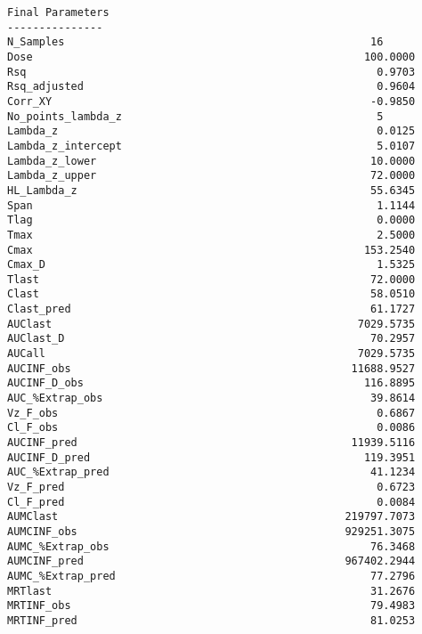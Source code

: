 \documentclass[12pt,a4paper]{article}
\begin{document}
\begin{verbatim}
Final Parameters
---------------
N_Samples                                                16
Dose                                                    100.0000
Rsq                                                       0.9703
Rsq_adjusted                                              0.9604
Corr_XY                                                  -0.9850
No_points_lambda_z                                        5
Lambda_z                                                  0.0125
Lambda_z_intercept                                        5.0107
Lambda_z_lower                                           10.0000
Lambda_z_upper                                           72.0000
HL_Lambda_z                                              55.6345
Span                                                      1.1144
Tlag                                                      0.0000
Tmax                                                      2.5000
Cmax                                                    153.2540
Cmax_D                                                    1.5325
Tlast                                                    72.0000
Clast                                                    58.0510
Clast_pred                                               61.1727
AUClast                                                7029.5735
AUClast_D                                                70.2957
AUCall                                                 7029.5735
AUCINF_obs                                            11688.9527
AUCINF_D_obs                                            116.8895
AUC_%Extrap_obs                                          39.8614
Vz_F_obs                                                  0.6867
Cl_F_obs                                                  0.0086
AUCINF_pred                                           11939.5116
AUCINF_D_pred                                           119.3951
AUC_%Extrap_pred                                         41.1234
Vz_F_pred                                                 0.6723
Cl_F_pred                                                 0.0084
AUMClast                                             219797.7073
AUMCINF_obs                                          929251.3075
AUMC_%Extrap_obs                                         76.3468
AUMCINF_pred                                         967402.2944
AUMC_%Extrap_pred                                        77.2796
MRTlast                                                  31.2676
MRTINF_obs                                               79.4983
MRTINF_pred                                              81.0253




\end{verbatim}
\end{document}
